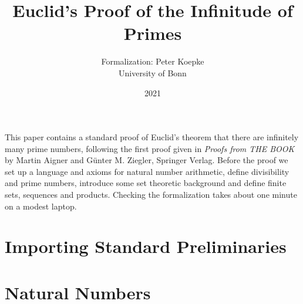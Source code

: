 \documentclass[11pt]{article}
\author{\Naproche{} Formalization: Peter Koepke\\
University of Bonn}
\title{Euclid's Proof of the Infinitude of Primes}
\date{2021}
\begin{document}
\newcommand{\Prod}[3]{#1_{#2} \cdots #1_{#3}}
\newcommand{\Seq}[2]{\{#1,\dots,#2\}}
\newcommand{\FinSet}[3]{\{#1_{#2},\dots,#1_{#3}\}}
\newcommand{\Primes}{\mathbb{P}}

\maketitle

\noindent
This paper contains a standard proof of Euclid's theorem
that there are infinitely many prime numbers,
following the first proof given in \emph{Proofs from THE BOOK}
by Martin Aigner and Günter M. Ziegler, Springer Verlag.
Before the proof we
set up a language and axioms for natural number arithmetic,
define divisibility and prime numbers,
introduce some set theoretic background and define
finite sets, sequences and products.
Checking the formalization takes about one minute on a modest
laptop.


\section{Importing Standard Preliminaries}

\begin{forthel}
\end{forthel}


\section{Natural Numbers}
\end{document}
